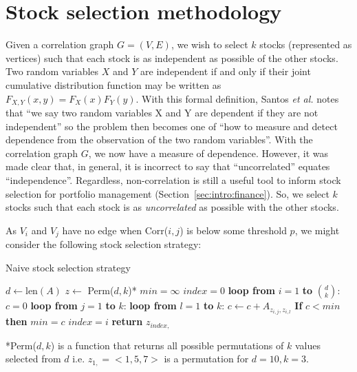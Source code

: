 \section{Stock selection methodology}
\label{sec:usage:stockselection}

Given a correlation graph $G=(V,E)$, we wish to select $k$ stocks (represented 
as vertices) such that each stock is as independent as possible of the other 
stocks. Two random variables $X$ and $Y$ are independent if and only if their 
joint cumulative distribution function may be written as 
$F_{X,Y}(x,y)=F_X(x)F_Y(y)$. With this formal definition, Santos \textit{et 
al.} notes that ``we say two random variables X and Y are dependent if they
are not independent'' so the problem then becomes one of ``how to measure and 
detect dependence from the observation of the two random 
variables''\cite{santos2013}. With the correlation graph $G$, we now have 
a measure of dependence. However, it was made clear that, in general, 
it is incorrect to say that ``uncorrelated'' equates ``independence''. 
Regardless, non-correlation is still a useful tool to inform stock selection 
for portfolio management (Section~\ref{sec:intro:finance}). So, we select $k$ 
stocks such that each stock is as \textit{uncorrelated} as possible with the 
other stocks.

As $V_i$ and $V_j$ have no edge when Corr($i,j$) is below some threshold $p$, 
we might consider the following stock selection strategy:

\tablespacing
\begin{algorithm}[H]
	\caption{Naive stock selection strategy}\label{alg:usage:stockselection1}
	\begin{algorithmic}[1]
		\State $d \gets \text{len}(A)$
		\State $z \gets$ Perm($d,k$)*
		\State $min = \infty$
		\State $index = 0$
		\State \textbf{loop from} $i=1$ \textbf{to} $d \choose k$:
		\State \indent $c = 0$
		\State \indent \textbf{loop from} $j = 1$ \textbf{to} $k$:
		\State \indent \indent \textbf{loop from} $l=1$ \textbf{to} $k$:
		\State \indent \indent \indent $c \gets c+A_{z_{i,j},z_{i,l}}$
		\State \indent \textbf{If} $c < min$ \textbf{then}
		\State \indent \indent $min = c$
		\State \indent \indent $index = i$
		\State \textbf{return} $z_{index,}$
		\EndProcedure
	\end{algorithmic}
	*Perm($d,k$) is a function that returns all possible permutations 
	of $k$ values selected from $d$ i.e. $z_{1,}=<1,5,7>$ is a permutation for 
	$d=10,k=3$.
\end{algorithm}
\bodyspacing

